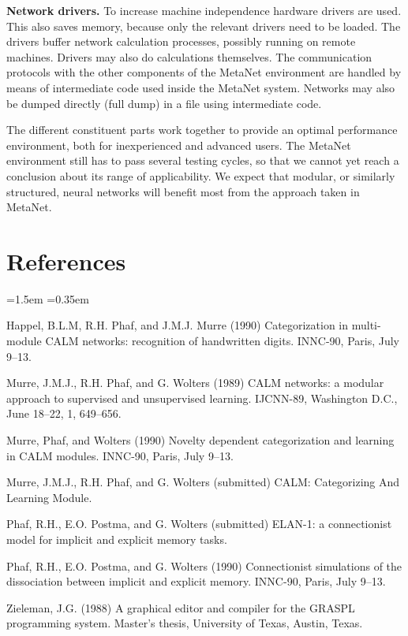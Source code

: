 \documentclass[11pt, a4paper]{article}
\begin{document}
\textbf{Network drivers.} To increase machine independence hardware drivers are used. This also saves memory, because only the relevant drivers need to be loaded. The drivers buffer network calculation processes, possibly running on remote machines. Drivers may also do calculations themselves. The communication protocols with the other components of the MetaNet environment are handled by means of intermediate code used inside the MetaNet system. Networks may also be dumped directly (full dump) in a file using intermediate code.

The different constituent parts work together to provide an optimal performance environment, both for inexperienced and advanced users. The MetaNet environment still has to pass several testing cycles, so that we cannot yet reach a conclusion about its range of applicability. We expect that modular, or similarly structured, neural networks will benefit most from the approach taken in MetaNet.

\section*{\color{navyaccent} References}

\begin{list}{}{\leftmargin=1.5em \itemsep=0.35em \parsep=0pt \small}
  \item Happel, B.L.M, R.H. Phaf, and J.M.J. Murre (1990) Categorization in multi-module CALM networks: recognition of handwritten digits. INNC-90, Paris, July 9--13.
  \item Murre, J.M.J., R.H. Phaf, and G. Wolters (1989) CALM networks: a modular approach to supervised and unsupervised learning. IJCNN-89, Washington D.C., June 18--22, 1, 649--656.
  \item Murre, Phaf, and Wolters (1990) Novelty dependent categorization and learning in CALM modules. INNC-90, Paris, July 9--13.
  \item Murre, J.M.J., R.H. Phaf, and G. Wolters (submitted) CALM: Categorizing And Learning Module.
  \item Phaf, R.H., E.O. Postma, and G. Wolters (submitted) ELAN-1: a connectionist model for implicit and explicit memory tasks.
  \item Phaf, R.H., E.O. Postma, and G. Wolters (1990) Connectionist simulations of the dissociation between implicit and explicit memory. INNC-90, Paris, July 9--13.
  \item Zieleman, J.G. (1988) A graphical editor and compiler for the GRASPL programming system. Master's thesis, University of Texas, Austin, Texas.
\end{list}
\end{document}
